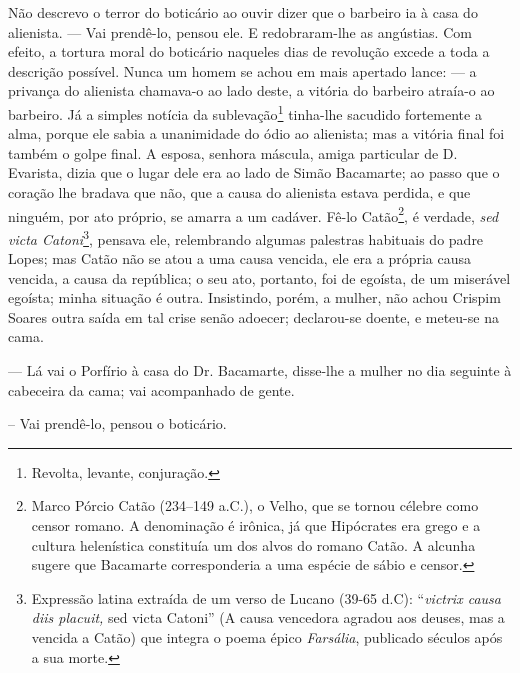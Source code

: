 Não descrevo o terror do boticário ao ouvir dizer que o barbeiro ia à
casa do alienista. --- Vai prendê-lo, pensou ele. E redobraram-lhe as
angústias. Com efeito, a tortura moral do boticário naqueles dias de
revolução excede a toda a descrição possível. Nunca um homem se achou em
mais apertado lance: --- a privança do alienista chamava-o ao lado
deste, a vitória do barbeiro atraía-o ao barbeiro. Já a simples notícia
da sublevação\footnote{Revolta, levante, conjuração.} tinha-lhe sacudido
fortemente a alma, porque ele sabia a unanimidade do ódio ao alienista;
mas a vitória final foi também o golpe final. A esposa, senhora máscula,
amiga particular de D. Evarista, dizia que o lugar dele era ao lado de
Simão Bacamarte; ao passo que o coração lhe bradava que não, que a causa
do alienista estava perdida, e que ninguém, por ato próprio, se amarra a
um cadáver. Fê-lo Catão\footnote{Marco Pórcio Catão (234--149 a.C.), o
  Velho, que se tornou célebre como censor romano. A denominação é
  irônica, já que Hipócrates era grego e a cultura helenística
  constituía um dos alvos do romano Catão. A alcunha sugere que
  Bacamarte corresponderia a uma espécie de sábio e censor.}, é verdade,
\emph{sed victa Catoni}\footnote{Expressão latina extraída de um verso
  de Lucano (39-65 d.C): ``\emph{victrix causa diis placuit,} sed victa
  Catoni'' (A causa vencedora agradou aos deuses, mas a vencida a Catão)
  que integra o poema épico \emph{Farsália}, publicado séculos após a
  sua morte.}, pensava ele, relembrando algumas palestras habituais do
padre Lopes; mas Catão não se atou a uma causa vencida, ele era a
própria causa vencida, a causa da república; o seu ato, portanto, foi de
egoísta, de um miserável egoísta; minha situação é outra. Insistindo,
porém, a mulher, não achou Crispim Soares outra saída em tal crise senão
adoecer; declarou-se doente, e meteu-se na cama.

--- Lá vai o Porfírio à casa do Dr. Bacamarte, disse-lhe a mulher no dia
seguinte à cabeceira da cama; vai acompanhado de gente.

-- Vai prendê-lo, pensou o boticário.

